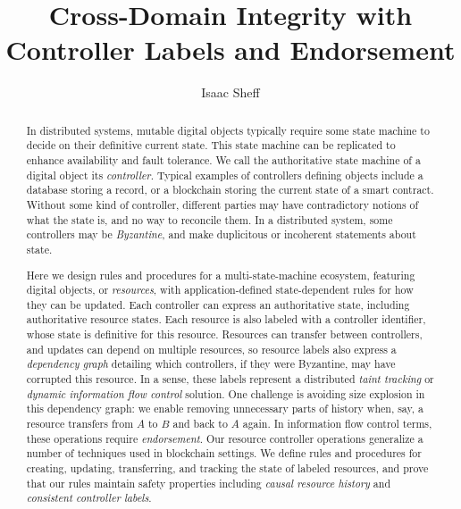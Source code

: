 \documentclass[a4paper,USenglish,cleveref, autoref, thm-restate, anonymous]{lipics-v2021}
\title{Cross-Domain Integrity with Controller Labels and Endorsement}%
\author{Isaac Sheff}{Heliax, Buffalo, USA \and \url{https://isaacsheff.com} }{isaac@heliax.dev}{https://orcid.org/0000-0002-1825-0097}{[(Optional) author-specific funding acknowledgements]}%
\begin{document}
\maketitle

\begin{abstract}
In distributed systems, mutable digital objects typically require some state machine to decide on their definitive current state.
This state machine can be replicated to enhance availability and fault tolerance.
We call the authoritative state machine of a digital object its \emph{controller}.
Typical examples of controllers defining objects include a database storing a record, or a blockchain storing the current state of a smart contract.
Without some kind of controller, different parties may have contradictory notions of what the state is, and no way to reconcile them.
In a distributed system, some controllers may be \emph{Byzantine}, and make duplicitous or incoherent statements about state. 

Here we design rules and procedures for a multi-state-machine ecosystem, featuring digital objects, or \emph{resources}, with application-defined state-dependent rules for how they can be updated. 
Each controller can express an authoritative state, including authoritative resource states. 
Each resource is also labeled with a controller identifier, whose state is definitive for this resource. 
Resources can transfer between controllers, and updates can depend on multiple resources, so resource labels also express a \emph{dependency graph} detailing which controllers, if they were Byzantine, may have corrupted this resource.
In a sense, these labels represent a distributed \emph{taint tracking} or \emph{dynamic information flow control} solution.
One challenge is avoiding size explosion in this dependency graph: we enable removing unnecessary parts of history when, say, a resource transfers from $A$ to $B$ and back to $A$ again.
In information flow control terms, these operations require \emph{endorsement}.
Our resource controller operations generalize a number of techniques used in blockchain settings.
We define rules and procedures for creating, updating, transferring, and tracking the state of labeled resources, and prove that our rules maintain safety properties including \emph{causal resource history} and \emph{consistent controller labels}.
\end{abstract}
\end{document}
